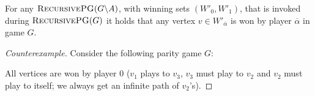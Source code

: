 \begin{conjecture}[Disproven]
	\label{con_opponent_a_always_wins}
	For any $\textsc{RecursivePG}(G\backslash A)$, with winning sets $(W'_0,W'_1)$, that is invoked during $\textsc{RecursivePG}(G)$ it holds that any vertex $v \in W'_{\overline{\alpha}}$ is won by player $\overline{\alpha}$ in game $G$.
	\begin{proof}[Counterexample]
		Consider the following parity game $G$:
		\begin{center}
		\end{center}
		
		All vertices are won by player $0$ ($v_1$ plays to $v_3$, $v_3$ must play to $v_2$ and $v_2$ must play to itself; we always get an infinite path of $v_2$'s).
		

\end{proof}
\end{conjecture}
